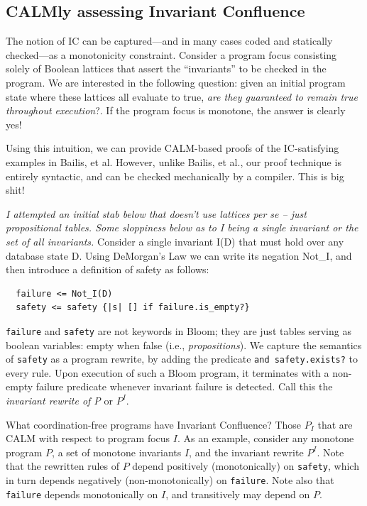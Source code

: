 \documentclass{sig-alternate}
\begin{document}
\subsection{CALMly assessing Invariant Confluence}
The notion of IC can be captured---and in many cases coded and statically checked---as a monotonicity constraint.
Consider a program focus consisting solely of Boolean lattices that assert the ``invariants'' to be checked in the program. We are interested in the following question: given an initial program state where these lattices all evaluate to true, \emph{are they guaranteed to remain true throughout execution}?.  If the program focus is monotone, the answer is clearly yes!

Using this intuition, we can provide CALM-based proofs of the IC-satisfying examples in Bailis, et al.  However, unlike Bailis, et al., our proof technique is entirely syntactic, and can be checked mechanically by a compiler.  This is big shit! 


\emph{I attempted an initial stab below that doesn't use lattices per se -- just propositional tables.  Some sloppiness below as to I being a single invariant or the set of all invariants.}
Consider a single invariant I(D) that must hold over any database state D.  Using DeMorgan's Law we can write its negation Not\_I, and then introduce a definition of safety as follows:

\begin{verbatim}
  failure <= Not_I(D)
  safety <= safety {|s| [] if failure.is_empty?}
\end{verbatim}

\texttt{failure} and \texttt{safety} are not keywords in Bloom; they are just tables serving as boolean variables: empty when false (i.e., \emph{propositions}). We capture the semantics of \texttt{safety} as a program rewrite, by adding the predicate \texttt{and safety.exists?} to every rule.  Upon execution of such a Bloom program, it terminates with a non-empty failure predicate whenever invariant failure is detected.  Call this the \emph{invariant rewrite of P} or $P^I$.  

What coordination-free programs have Invariant Confluence?   Those $P_I$ that are CALM with respect to program focus $I$. As an example, consider any monotone program $P$, a set of monotone invariants $I$, and the invariant rewrite $P^I$.  Note that the rewritten rules of $P$ depend positively (monotonically) on \texttt{safety}, which in turn depends negatively (non-monotonically) on \texttt{failure}.  Note also that \texttt{failure} depends monotonically on $I$, and transitively may depend on $P$.
\end{document}
